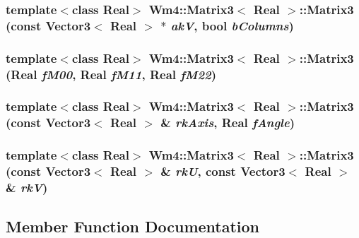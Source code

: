 \subsubsection{\setlength{\rightskip}{0pt plus 5cm}template$<$class Real$>$ {\bf Wm4::Matrix3}$<$ Real $>$::{\bf Matrix3} (const {\bf Vector3}$<$ Real $>$ $\ast$ {\em ak\-V}, bool {\em b\-Columns})}\label{classWm4_1_1Matrix3_40317ee53dedc5de8856dba80dfd08e9}


\subsubsection{\setlength{\rightskip}{0pt plus 5cm}template$<$class Real$>$ {\bf Wm4::Matrix3}$<$ Real $>$::{\bf Matrix3} (Real {\em f\-M00}, Real {\em f\-M11}, Real {\em f\-M22})}\label{classWm4_1_1Matrix3_549e663ac03cbb31875320eebd12793a}


\subsubsection{\setlength{\rightskip}{0pt plus 5cm}template$<$class Real$>$ {\bf Wm4::Matrix3}$<$ Real $>$::{\bf Matrix3} (const {\bf Vector3}$<$ Real $>$ \& {\em rk\-Axis}, Real {\em f\-Angle})}\label{classWm4_1_1Matrix3_019006edd213d48113e80af4a80d10c2}


\subsubsection{\setlength{\rightskip}{0pt plus 5cm}template$<$class Real$>$ {\bf Wm4::Matrix3}$<$ Real $>$::{\bf Matrix3} (const {\bf Vector3}$<$ Real $>$ \& {\em rk\-U}, const {\bf Vector3}$<$ Real $>$ \& {\em rk\-V})}\label{classWm4_1_1Matrix3_48cbfa5bade6cb08ac6df155c1ded0c2}




\subsection{Member Function Documentation}
